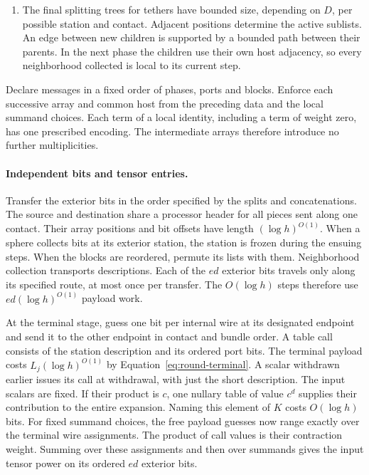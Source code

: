 \begin{enumerate}
Compute the autocorrelations $\sum_i x_i x_{i+z}$ simultaneously by
squaring the Walsh coefficients and inverting the transform. This
takes $O(N_b\log N_b)$ operations on $(\log h)^{O(1)}$-bit local
integers. Aggregate the coefficients by difference and prefix
length. At the root one can enumerate all invertible matrices in
dimension $\log_2 N_b=O((\log h)^2)$ within
$2^{(\log h)^{O(1)}}$ bit operations. The first minimizer satisfies
the bound proved by averaging. Positions permute their block arrays
accordingly. The bounded length ratios of intersecting leaves and
the bounded number of units per leaf then allow the terminal
assignments, rotor settings and new labels to be determined from
neighboring records.
\item The final splitting trees for tethers have bounded size,
depending on $D$, per possible station and contact. Adjacent
positions determine the active sublists. An edge between new
children is supported by a bounded path between their parents. In
the next phase the children use their own host adjacency, so every
neighborhood collected is local to its current step.
\end{enumerate}

Declare messages in a fixed order of phases, ports and blocks.
Enforce each successive array and common host from the preceding
data and the local summand choices. Each term of a local identity,
including a term of weight zero, has one prescribed encoding. The
intermediate arrays therefore introduce no further multiplicities.

\paragraph{Independent bits and tensor entries.}
Transfer the exterior bits in the order specified by the splits and
concatenations. The source and destination share a processor header
for all pieces sent along one contact. Their array positions and bit
offsets have length $(\log h)^{O(1)}$. When a sphere collects bits
at its exterior station, the station is frozen during the ensuing
steps. When the blocks are reordered, permute its lists with them.
Neighborhood collection transports descriptions. Each of the $ed$
exterior bits travels only along its specified route, at most once
per transfer. The $O(\log h)$ steps therefore use
$ed(\log h)^{O(1)}$ payload work.

At the terminal stage, guess one bit per internal wire at its
designated endpoint and send it to the other endpoint in contact
and bundle order. A table call consists of the station description
and its ordered port bits. The terminal payload costs
$L_j(\log h)^{O(1)}$ by Equation~\eqref{eq:round-terminal}.
A scalar withdrawn earlier issues its call at withdrawal, with just
the short description. The input scalars are fixed. If their product
is $c$, one nullary table of value $c^d$ supplies their contribution
to the entire expansion. Naming this element of $K$ costs $O(\log h)$
bits. For fixed summand choices, the free
payload guesses now range exactly over the terminal wire
assignments. The product of call values is their contraction
weight. Summing over these assignments and then over summands gives
the input tensor power on its ordered $ed$ exterior bits.

